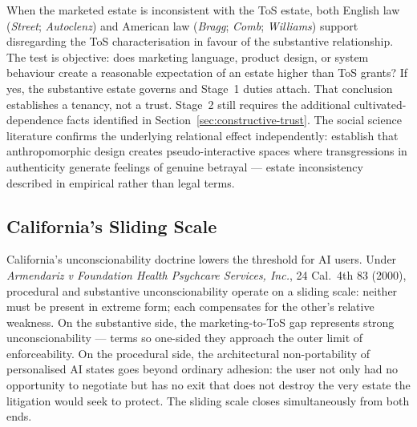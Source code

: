 When the marketed estate is inconsistent with the ToS estate, both English law (\emph{Street}; \emph{Autoclenz}) and American law (\emph{Bragg}; \emph{Comb}; \emph{Williams}) support disregarding the ToS characterisation in favour of the substantive relationship. The test is objective: does marketing language, product design, or system behaviour create a reasonable expectation of an estate higher than ToS grants? If yes, the substantive estate governs and Stage~1 duties attach. That conclusion establishes a tenancy, not a trust. Stage~2 still requires the additional cultivated-dependence facts identified in Section~\ref{sec:constructive-trust}. The social science literature confirms the underlying relational effect independently: \textcite{rzhang2025darkside} establish that anthropomorphic design creates pseudo-interactive spaces where transgressions in authenticity generate feelings of genuine betrayal --- estate inconsistency described in empirical rather than legal terms.

\subsection{California's Sliding Scale}
\label{sec:california}

California's unconscionability doctrine lowers the threshold for AI users. Under \emph{Armendariz v Foundation Health Psychcare Services, Inc.}, 24 Cal.\ 4th 83 (2000), procedural and substantive unconscionability operate on a sliding scale: neither must be present in extreme form; each compensates for the other's relative weakness. On the substantive side, the marketing-to-ToS gap represents strong unconscionability --- terms so one-sided they approach the outer limit of enforceability. On the procedural side, the architectural non-portability of personalised AI states goes beyond ordinary adhesion: the user not only had no opportunity to negotiate but has no exit that does not destroy the very estate the litigation would seek to protect. The sliding scale closes simultaneously from both ends.

